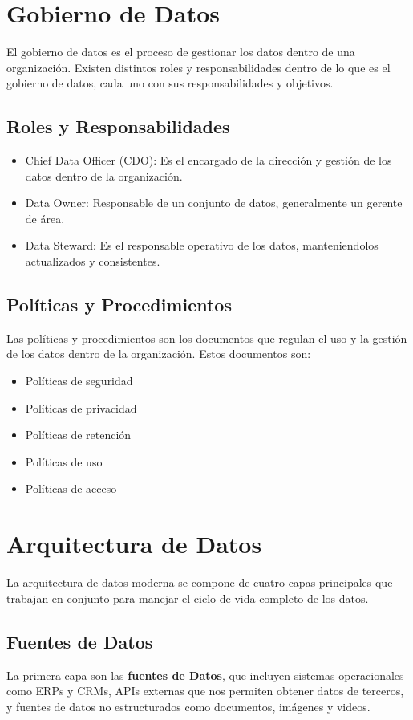 \documentclass[12pt]{article}
\begin{document}
\section{Gobierno de Datos}
El gobierno de datos es el proceso de gestionar los datos dentro de una organización. Existen distintos roles y responsabilidades dentro de lo que es el gobierno de datos, cada uno con sus responsabilidades y objetivos.

\subsection{Roles y Responsabilidades}
\begin{itemize}
    \item Chief Data Officer (CDO): Es el encargado de la dirección y gestión de los datos dentro de la organización.
    \item Data Owner: Responsable de un conjunto de datos, generalmente un gerente de área.
    \item Data Steward: Es el responsable operativo de los datos, manteniendolos actualizados y consistentes.
\end{itemize}

\subsection{Políticas y Procedimientos}
Las políticas y procedimientos son los documentos que regulan el uso y la gestión de los datos dentro de la organización. Estos documentos son:
\begin{itemize}
    \item Políticas de seguridad
    \item Políticas de privacidad
    \item Políticas de retención
    \item Políticas de uso
    \item Políticas de acceso
\end{itemize}

\section{Arquitectura de Datos}
La arquitectura de datos moderna se compone de cuatro capas principales que trabajan en conjunto para manejar el ciclo de vida completo de los datos.

\subsection{Fuentes de Datos}
La primera capa son las \textbf{fuentes de Datos}, que incluyen sistemas operacionales como ERPs y CRMs, APIs externas que nos permiten obtener datos de terceros, y fuentes de datos no estructurados como documentos, imágenes y videos.
\end{document}
